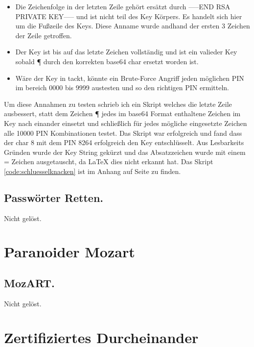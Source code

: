 \documentclass[12pt, a4paper, titlepage, oneside]{scrartcl}
\begin{document}
	\begin{itemize}
		\item Die Zeichenfolge in der letzten Zeile gehört ersätzt durch -----END RSA PRIVATE KEY----- und ist nicht teil des Key Körpers. Es handelt sich hier um die Fußzeile des Keys. Diese Anname wurde andhand der ersten 3 Zeichen der Zeile getroffen.
		\item Der Key ist bis auf das letzte Zeichen vollständig und ist ein valieder Key sobald ¶ durch den korrekten base64 char ersetzt worden ist. 
		\item Wäre der Key in tackt, könnte ein Brute-Force Angriff jeden möglichen PIN im bereich 0000 bis 9999 austesten und so den richtigen PIN ermitteln.
	\end{itemize}

	Um diese Annahmen zu testen schrieb ich ein Skript welches die letzte Zeile ausbessert, statt dem Zeichen ¶ jedes im base64 Format enthaltene Zeichen im Key nach einander einsetzt und schließlich für jedes mögliche eingesetzte Zeichen alle 10000 PIN Kombinationen testet. Das Skript war erfolgreich und fand dass der char 8 mit dem PIN 8264 erfolgreich den Key entschlüsselt. Aus Lesbarkeits Gründen wurde der Key String gekürzt und das Absatzzeichen wurde mit einem = Zeichen ausgetauscht, da LaTeX dies nicht erkannt hat. Das Skript \ref{code:schluesselknacken} ist im Anhang auf Seite \pageref{code:schluesselknacken} zu finden.



	\subsection{Passw\"orter Retten.}
	Nicht gelöst.

	\section{Paranoider Mozart}

	\subsection{MozART.}
	Nicht gelöst.

	\newpage

	\section{Zertifiziertes Durcheinander}
\end{document}
